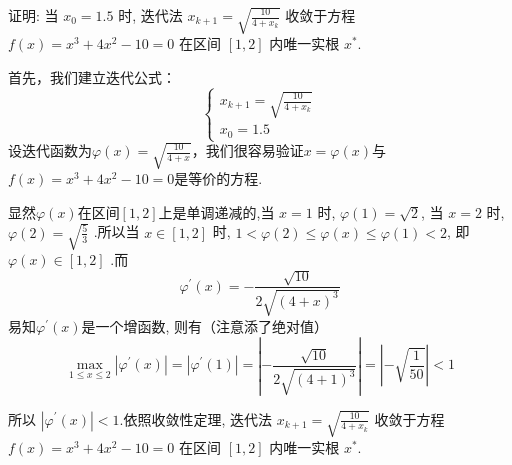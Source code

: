 \begin{tcolorbox}[breakable,
		colframe=white!10!jingga, coltitle=white!90!jingga, colback=white!95!jingga, coltext=black, colbacktitle=white!10!jingga, enhanced, fonttitle=\bfseries,fontupper=\normalsize, attach boxed title to top left={yshift=-2mm}, before skip=8pt, after skip=8pt,
		title=解答题]


  证明: 当 $ x_{0}=1.5 $ 时, 迭代法 $ x_{k+1}=\sqrt{\frac{10}{4+x_{k}}} $ 收敛于方程 $ f(x)=x^{3}+4 x^{2}-10=0 $ 在区间 $ [1,2] $ 内唯一实根 $ x^{*} $.

   \tcblower

首先，我们建立迭代公式：
$$
\left\{
\begin{array}{l}
x_{k+1}=\sqrt{\frac{10}{4+x_{k}}} \\
x_{0}=1.5
\end{array}
\right.
$$
设迭代函数为$\varphi(x)=\sqrt{\frac{10}{4+x}}$，我们很容易验证$x=\varphi(x)$与$f(x)=x^{3}+4x^{2}-10=0$是等价的方程.

显然$\varphi(x)$在区间$[1,2]$上是单调递减的,当 $ {x}=1 $ 时, $ \varphi(1)=\sqrt{2} $, 当 $ {x}=2 $ 时, $ \varphi(2)=\sqrt{\frac{5}{3}} $ .所以当 $ {x} \in[1,2] $ 时, $ 1<\varphi(2) \leqslant \varphi({x}) \leqslant \varphi(1)<2 $, 即 $ \varphi({x}) \in[1,2] $ .而
$$ \varphi ^{\prime}(x)=-\frac{\sqrt{10}}{2\sqrt{(4+x)^{3}}}$$
易知$ \varphi ^{\prime}(x)$是一个增函数, 则有（注意添了绝对值）
$$
\max _{1 \leqslant x \leqslant 2}\left|\varphi^{\prime}(x)\right|=|\varphi^{\prime}(1)|=\left|- \frac{\sqrt{10}}{2\sqrt{(4+1)^{3}}}\right|=\left|-\sqrt{\frac{1}{50}}\right|<1
$$

 所以 $|\varphi^{\prime}({x})|<1 $.依照收敛性定理, 迭代法 $ {x}_{{k}+1}=\sqrt{\frac{10}{4+{x}_{{k}}}} $ 收敛于方程 $ f(x)=x^{3}+4 x^{2}-10=0 $ 在区间 $ [1,2] $ 内唯一实根 $ x^{*} $.


\end{tcolorbox}

